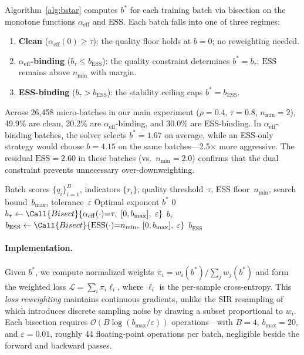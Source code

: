 Algorithm~\ref{alg:bstar} computes $b^{*}$ for each training batch via bisection on the monotone functions $\alpha_{\mathrm{eff}}$ and $\mathrm{ESS}$.
Each batch falls into one of three regimes:
\begin{enumerate}[nosep,leftmargin=*]
  \item \textbf{Clean} ($\alpha_{\mathrm{eff}}(0) \geq \tau$): the quality floor holds at $b = 0$; no reweighting needed.
  \item \textbf{$\alpha_{\mathrm{eff}}$-binding} ($b_\tau \leq b_{\mathrm{ESS}}$): the quality constraint determines $b^{*} = b_\tau$; $\mathrm{ESS}$ remains above $n_{\min}$ with margin.
  \item \textbf{ESS-binding} ($b_\tau > b_{\mathrm{ESS}}$): the stability ceiling caps $b^{*} = b_{\mathrm{ESS}}$.
\end{enumerate}
Across 26{,}458 micro-batches in our main experiment ($\rho{=}0.4$, $\tau{=}0.8$, $n_{\min}{=}2$), 49.9\% are clean, 20.2\% are $\alpha_{\mathrm{eff}}$-binding, and 30.0\% are ESS-binding.
In $\alpha_{\mathrm{eff}}$-binding batches, the solver selects $b^{*} = 1.67$ on average, while an ESS-only strategy would choose $b = 4.15$ on the same batches---2.5$\times$ more aggressive.
The residual $\mathrm{ESS} = 2.60$ in these batches (vs.\ $n_{\min} = 2.0$) confirms that the dual constraint prevents unnecessary over-downweighting.

\begin{algorithm}[t]
\caption{Per-batch adaptive $b^{*}$ selection}
\label{alg:bstar}
\begin{algorithmic}[1]
\Require Batch scores $\{q_i\}_{i=1}^{B}$, indicators $\{r_i\}$, quality threshold~$\tau$, ESS floor~$n_{\min}$, search bound~$b_{\max}$, tolerance~$\varepsilon$
\Ensure Optimal exponent $b^{*}$
  \State \Return $0$ 
\EndIf
\State $b_\tau \gets \Call{Bisect}{\alpha_{\mathrm{eff}}(\cdot){=}\tau,\; [0, b_{\max}],\; \varepsilon}$
  \State \Return $b_\tau$ 
\Else
  \State $b_{\mathrm{ESS}} \gets \Call{Bisect}{\mathrm{ESS}(\cdot){=}n_{\min},\; [0, b_{\max}],\; \varepsilon}$
  \State \Return $b_{\mathrm{ESS}}$ 
\EndIf
\end{algorithmic}
\end{algorithm}

\paragraph{Implementation.}
Given $b^{*}$, we compute normalized weights $\pi_i = w_i(b^{*}) / \sum_j w_j(b^{*})$ and form the weighted loss $\mathcal{L} = \sum_i \pi_i \ell_i$, where $\ell_i$ is the per-sample cross-entropy.
This \emph{loss reweighting} maintains continuous gradients, unlike the SIR resampling of \citet{drayson_2025_detection_collapse} which introduces discrete sampling noise by drawing a subset proportional to $w_i$.
Each bisection requires $\mathcal{O}(B \log(b_{\max}/\varepsilon))$ operations---with $B{=}4$, $b_{\max}{=}20$, and $\varepsilon{=}0.01$, roughly 44 floating-point operations per batch, negligible beside the forward and backward passes.


